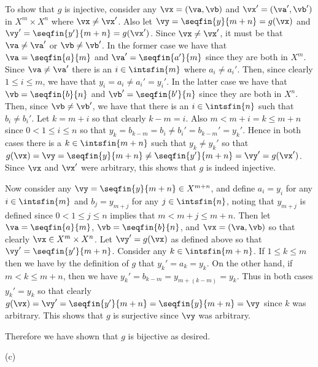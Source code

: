 {{    To show that $g$ is injective, consider any $\vx = (\va, \vb)$ and $\vx' = (\va', \vb')$ in  $X^m \times X^n$ where $\vx \neq \vx'$.
    Also let $\vy = \seqfin{y}{m+n} = g(\vx)$ and $\vy' = \seqfin{y'}{m+n} = g(\vx')$.
    Since $\vx \neq \vx'$, it must be that $\va \neq \va'$ or $\vb \neq \vb'$.
    In the former case we have that $\va = \seqfin{a}{m}$ and $\va' = \seqfin{a'}{m}$ since they are both in $X^m$.
    Since $\va \neq \va'$ there is an $i \in \intsfin{m}$ where $a_i \neq a_i'$.
    Then, since clearly $1 \leq i \leq m$, we have that $y_i = a_i \neq a_i' = y_i'$.
    In the latter case we have that $\vb = \seqfin{b}{n}$ and $\vb' = \seqfin{b'}{n}$ since they are both in $X^n$.
    Then, since $\vb \neq \vb'$, we have that there is an $i \in \intsfin{n}$ such that $b_i \neq b_i'$.
    Let $k = m+i$ so that clearly $k-m = i$.
    Also $m < m+i = k \leq m+n$ since $0 < 1 \leq i \leq n$ so that $y_k = b_{k-m} = b_i \neq b_i' = b_{k-m}' = y_k'$.
    Hence in both cases there is a $k \in \intsfin{m+n}$ such that $y_k \neq y_k'$ so that $g(\vx) = \vy = \seqfin{y}{m+n} \neq \seqfin{y'}{m+n} = \vy' = g(\vx')$.
    Since $\vx$ and $\vx'$ were arbitrary, this shows that $g$ is indeed injective.

    Now consider any $\vy = \seqfin{y}{m+n} \in X^{m+n}$, and define $a_i = y_i$ for any $i \in \intsfin{m}$ and $b_j = y_{m+j}$ for any $j \in \intsfin{n}$, noting that $y_{m+j}$ is defined since $0 < 1 \leq j \leq n$ implies that $m < m+j \leq m+n$.
    Then let $\va = \seqfin{a}{m}$, $\vb = \seqfin{b}{n}$, and $\vx = (\va,\vb)$ so that clearly $\vx \in X^m \times X^n$.
    Let $\vy' = g(\vx)$ as defined above so that $\vy' = \seqfin{y'}{m+n}$.
    Consider any $k \in \intsfin{m+n}$.
    If $1 \leq k \leq m$ then we have by the definition of $g$ that $y_k' = a_k = y_k$.
    On the other hand, if $m < k \leq m+n$, then we have $y_k' = b_{k-m} = y_{m+(k-m)} = y_k$.
    Thus in both cases $y_k' = y_k$ so that clearly $g(\vx) = \vy' = \seqfin{y'}{m+n} = \seqfin{y}{m+n} = \vy$ since $k$ was arbitrary.
    This shows that $g$ is surjective since $\vy$ was arbitrary.

    Therefore we have shown that $g$ is bijective as desired.
  }

  (c) \partc
  }
